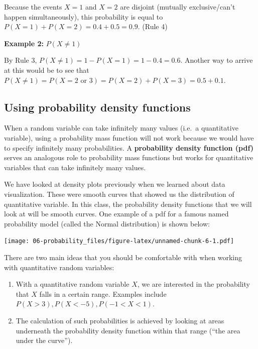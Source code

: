 \documentclass[
]{book}
\providecommand{\tightlist}{%
  \setlength{\itemsep}{0pt}\setlength{\parskip}{0pt}}
\begin{document}
Because the events \(X = 1\) and \(X = 2\) are disjoint (mutually exclusive/can't happen simultaneously), this probability is equal to \(P(X = 1) + P(X = 2) = 0.4 + 0.5 = 0.9\). (Rule 4)

\textbf{Example 2:} \(P(X \neq 1)\)

By Rule 3, \(P(X \neq 1) = 1 - P(X = 1) = 1 - 0.4 = 0.6\). Another way to arrive at this would be to see that \(P(X \neq 1) = P(X = 2 \text{ or } 3) = P(X = 2) + P(X = 3) = 0.5 + 0.1\).

\hypertarget{using-probability-density-functions}{%
\subsection{Using probability density functions}\label{using-probability-density-functions}}

When a random variable can take infinitely many values (i.e.~a quantitative variable), using a probability mass function will not work because we would have to specify infinitely many probabilities. A \textbf{probability density function (pdf)} serves an analogous role to probability mass functions but works for quantitative variables that can take infinitely many values.

We have looked at density plots previously when we learned about data visualization. These were smooth curves that showed us the distribution of quantitative variable. In this class, the probability density functions that we will look at will be smooth curves. One example of a pdf for a famous named probability model (called the Normal distribution) is shown below:

\texttt{[image: 06-probability\_files/figure-latex/unnamed-chunk-6-1.pdf]}

There are two main ideas that you should be comfortable with when working with quantitative random variables:

\begin{enumerate}
\def\labelenumi{\arabic{enumi}.}
\tightlist
\item
  With a quantitative random variable \(X\), we are interested in the probability that \(X\) falls in a certain range. Examples include \(P(X > 3), P(X < -5), P(-1 < X < 1)\).
\item
  The calculation of such probabilities is achieved by looking at areas underneath the probability density function within that range (``the area under the curve'').
\end{enumerate}
\end{document}
